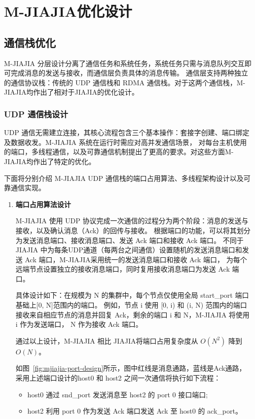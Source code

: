 {    \section{M-JIAJIA优化设计}
    \subsection{通信栈优化}
    M-JIAJIA 分层设计分离了通信任务和系统任务，系统任务只需与消息队列交互即可完成消息的发送与接收，而通信层负责具体的消息传输。
    通信层支持两种独立的通信协议栈：传统的 UDP 通信栈和 RDMA 通信栈。对于这两个通信栈，M-JIAJIA均作出了相对于JIAJIA的优化设计。

    \subsubsection{UDP 通信栈设计}
    UDP 通信无需建立连接，其核心流程包含三个基本操作：套接字创建、端口绑定及数据收发。M-JIAJIA 系统在运行时需应对高并发通信场景，
    对每台主机使用的端口，多线程通信，以及可靠通信机制提出了更高的要求。对这些方面M-JIAJIA均作出了特定的优化。

    下面将分别介绍 M-JIAJIA UDP 通信栈的端口占用算法、多线程架构设计以及可靠通信实现。
    \begin{enumerate}[label=\arabic*.]
        \item \textbf{端口占用算法设计}

              M-JIAJIA 使用 UDP 协议完成一次通信的过程分为两个阶段：消息的发送与接收，以及确认消息（Ack）的回传与接收。
              根据端口的功能，可以将其划分为发送消息端口、接收消息端口、发送 Ack 端口和接收 Ack 端口。
              不同于 JIAJIA 中为每条UDP通道（每两台之间通信）设置随机的发送消息端口和发送 Ack 端口，M-JIAJIA采用统一的发送消息端口和接收 Ack 端口，
              为每个远端节点设置独立的接收消息端口，同时复用接收消息端口为发送 Ack 端口。

              具体设计如下：在规模为 N 的集群中，每个节点仅使用全局 start\_port 端口基础上[0, N]范围内的端口。
              例如，节点 i 使用 [0, i) 和 (i, N) 范围内的端口接收来自相应节点的消息并回复 Ack，剩余的端口 i 和 N，M-JIAJIA 将使用 i 作为发送端口，
              N 作为接收 Ack 端口。

              通过以上设计，M-JIAJIA 相比 JIAJIA将端口占用复杂度从 $O(N^2)$ 降到 $O(N)$。

              如图~\ref{fig:mjiajia-port-design}所示，图中红线是消息通路，蓝线是Ack通路，采用上述端口设计的host0 和 host2 之间一次通信将执行如下流程：
              \begin{itemize}
                  \item host0 通过 snd\_port 发送消息至 host2 的 port 0 接口端口;
                  \item host2 利用 port 0 作为发送 Ack 端口发送 Ack 至 host0 的 ack\_port。
              \end{itemize}


\end{enumerate}}
